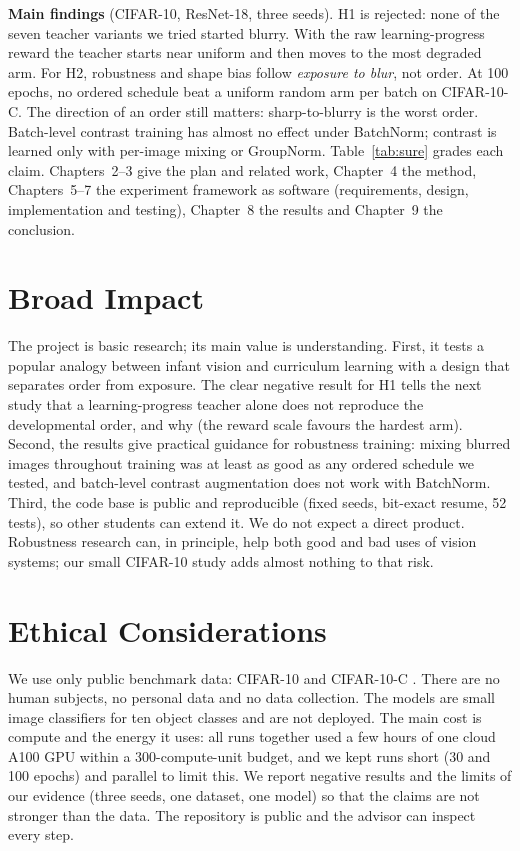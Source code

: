\documentclass[a4paper,12pt]{report}
\begin{document}
\textbf{Main findings} (CIFAR-10, ResNet-18, three seeds). H1 is rejected: none of the seven teacher variants we tried started blurry. With the raw learning-progress reward the teacher starts near uniform and then moves to the most degraded arm. For H2, robustness and shape bias follow \emph{exposure to blur}, not order. At 100 epochs, no ordered schedule beat a uniform random arm per batch on CIFAR-10-C. The direction of an order still matters: sharp-to-blurry is the worst order. Batch-level contrast training has almost no effect under BatchNorm; contrast is learned only with per-image mixing or GroupNorm. Table~\ref{tab:sure} grades each claim. Chapters~2--3 give the plan and related work, Chapter~4 the method, Chapters~5--7 the experiment framework as software (requirements, design, implementation and testing), Chapter~8 the results and Chapter~9 the conclusion.

\section{Broad Impact}

The project is basic research; its main value is understanding. First, it tests a popular analogy between infant vision and curriculum learning with a design that separates order from exposure. The clear negative result for H1 tells the next study that a learning-progress teacher alone does not reproduce the developmental order, and why (the reward scale favours the hardest arm). Second, the results give practical guidance for robustness training: mixing blurred images throughout training was at least as good as any ordered schedule we tested, and batch-level contrast augmentation does not work with BatchNorm. Third, the code base is public and reproducible (fixed seeds, bit-exact resume, 52 tests), so other students can extend it. We do not expect a direct product. Robustness research can, in principle, help both good and bad uses of vision systems; our small CIFAR-10 study adds almost nothing to that risk.

\section{Ethical Considerations}

We use only public benchmark data: CIFAR-10 \cite{krizhevsky2009} and CIFAR-10-C \cite{hendrycks2019}. There are no human subjects, no personal data and no data collection. The models are small image classifiers for ten object classes and are not deployed. The main cost is compute and the energy it uses: all runs together used a few hours of one cloud A100 GPU within a 300-compute-unit budget, and we kept runs short (30 and 100 epochs) and parallel to limit this. We report negative results and the limits of our evidence (three seeds, one dataset, one model) so that the claims are not stronger than the data. The repository is public and the advisor can inspect every step.
\end{document}

